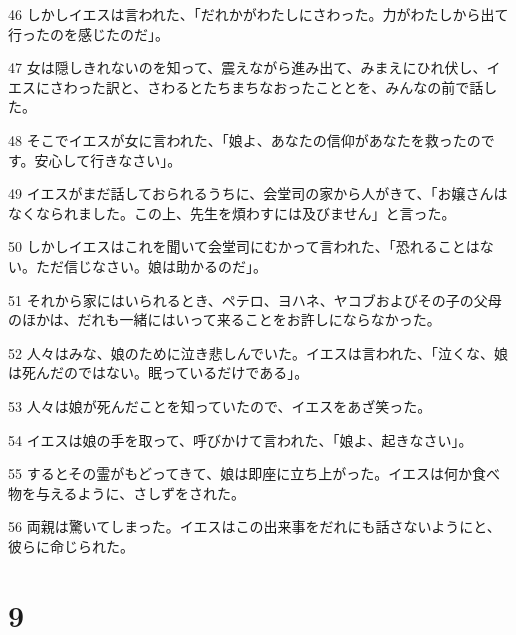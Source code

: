 \par 46 しかしイエスは言われた、「だれかがわたしにさわった。力がわたしから出て行ったのを感じたのだ」。
\par 47 女は隠しきれないのを知って、震えながら進み出て、みまえにひれ伏し、イエスにさわった訳と、さわるとたちまちなおったこととを、みんなの前で話した。
\par 48 そこでイエスが女に言われた、「娘よ、あなたの信仰があなたを救ったのです。安心して行きなさい」。
\par 49 イエスがまだ話しておられるうちに、会堂司の家から人がきて、「お嬢さんはなくなられました。この上、先生を煩わすには及びません」と言った。
\par 50 しかしイエスはこれを聞いて会堂司にむかって言われた、「恐れることはない。ただ信じなさい。娘は助かるのだ」。
\par 51 それから家にはいられるとき、ペテロ、ヨハネ、ヤコブおよびその子の父母のほかは、だれも一緒にはいって来ることをお許しにならなかった。
\par 52 人々はみな、娘のために泣き悲しんでいた。イエスは言われた、「泣くな、娘は死んだのではない。眠っているだけである」。
\par 53 人々は娘が死んだことを知っていたので、イエスをあざ笑った。
\par 54 イエスは娘の手を取って、呼びかけて言われた、「娘よ、起きなさい」。
\par 55 するとその霊がもどってきて、娘は即座に立ち上がった。イエスは何か食べ物を与えるように、さしずをされた。
\par 56 両親は驚いてしまった。イエスはこの出来事をだれにも話さないようにと、彼らに命じられた。

\chapter{9}

